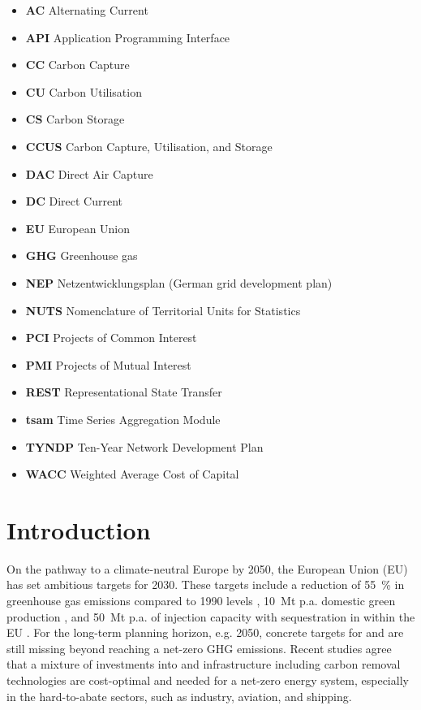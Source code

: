 \documentclass[preprint,12pt,sort&compress]{elsarticle}
\begin{document}
\begin{itemize}[left=0pt, label={}, itemsep=0pt, parsep=0pt, topsep=0pt]
  \item \textbf{AC} \enspace Alternating Current
  \item \textbf{API} \enspace Application Programming Interface
  \item \textbf{CC} \enspace Carbon Capture
  \item \textbf{CU} \enspace Carbon Utilisation
  \item \textbf{CS} \enspace Carbon Storage
  \item \textbf{CCUS} \enspace Carbon Capture, Utilisation, and Storage
  \item \textbf{DAC} \enspace Direct Air Capture
  \item \textbf{DC} \enspace Direct Current
  \item \textbf{EU} \enspace European Union
  \item \textbf{GHG} \enspace Greenhouse gas
  \item \textbf{NEP} \enspace Netzentwicklungsplan (German grid development plan)
  \item \textbf{NUTS} \enspace Nomenclature of Territorial Units for Statistics
  \item \textbf{PCI} \enspace Projects of Common Interest
  \item \textbf{PMI} \enspace Projects of Mutual Interest
  \item \textbf{REST} \enspace Representational State Transfer 
  \item \textbf{tsam} \enspace Time Series Aggregation Module
  \item \textbf{TYNDP} \enspace Ten-Year Network Development Plan
  \item \textbf{WACC} \enspace Weighted Average Cost of Capital

\end{itemize}

\section{Introduction}
\label{sec:introduction}
On the pathway to a climate-neutral Europe by 2050, the European Union (EU) has set ambitious targets for 2030. These targets include a reduction of \SI{55}{\percent} in greenhouse gas emissions compared to 1990 levels \cite{europeancommissionFit55Delivering2021}, \SI{10}{Mt} p.a. domestic green  production \cite{europeancommissionREPowerEUPlanCommunication2022}, and \SI{50}{Mt} p.a. of  injection capacity with sequestration in within the EU \cite{europeanparliamentRegulationEU20242024}.
For the long-term planning horizon, e.g. 2050, concrete targets for  and  are still missing beyond reaching a net-zero GHG emissions. Recent studies \cite{fleiterHydrogenInfrastructureFuture2025,neumannPotentialRoleHydrogen2023,hofmannH2CO2Network2025} agree that a mixture of investments into  and  infrastructure including carbon removal technologies are cost-optimal and needed for a net-zero energy system, especially in the hard-to-abate sectors, such as industry, aviation, and shipping. 
\end{document}
